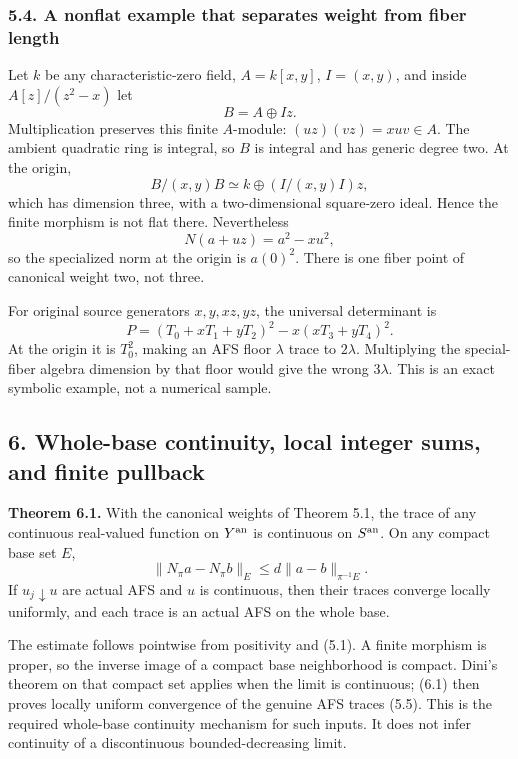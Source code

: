 \documentclass[
  10pt,
]{article}
\begin{document}
\subsubsection{5.4. A nonflat example that separates weight from fiber
length}\label{a-nonflat-example-that-separates-weight-from-fiber-length}

Let \(k\) be any characteristic-zero field, \(A=k[x,y]\), \(I=(x,y)\),
and inside \(A[z]/(z^2-x)\) let \[B=A\oplus Iz.\] Multiplication
preserves this finite \(A\)-module: \((uz)(vz)=xuv\in A\). The ambient
quadratic ring is integral, so \(B\) is integral and has generic degree
two. At the origin, \[B/(x,y)B\simeq k\oplus (I/(x,y)I)z,\] which has
dimension three, with a two-dimensional square-zero ideal. Hence the
finite morphism is not flat there. Nevertheless \[N(a+uz)=a^2-xu^2,\] so
the specialized norm at the origin is \(a(0)^2\). There is one fiber
point of canonical weight two, not three.

For original source generators \(x,y,xz,yz\), the universal determinant
is \[P=(T_0+xT_1+yT_2)^2-x(xT_3+yT_4)^2.\tag{5.6}\] At the origin it is
\(T_0^2\), making an AFS floor \(\lambda\) trace to \(2\lambda\).
Multiplying the special-fiber algebra dimension by that floor would give
the wrong \(3\lambda\). This is an exact symbolic example, not a
numerical sample.

\subsection{6. Whole-base continuity, local integer sums, and finite
pullback}\label{whole-base-continuity-local-integer-sums-and-finite-pullback}

\textbf{Theorem 6.1.} With the canonical weights of Theorem 5.1, the
trace of any continuous real-valued function on \(Y^{\rm an}\) is
continuous on \(S^{\rm an}\). On any compact base set \(E\),
\[\|N_\pi a-N_\pi b\|_E\le d\|a-b\|_{\pi^{-1}E}.\tag{6.1}\] If
\(u_j\downarrow u\) are actual AFS and \(u\) is continuous, then their
traces converge locally uniformly, and each trace is an actual AFS on
the whole base.

The estimate follows pointwise from positivity and (5.1). A finite
morphism is proper, so the inverse image of a compact base neighborhood
is compact. Dini's theorem on that compact set applies when the limit is
continuous; (6.1) then proves locally uniform convergence of the genuine
AFS traces (5.5). This is the required whole-base continuity mechanism
for such inputs. It does not infer continuity of a discontinuous
bounded-decreasing limit.
\end{document}
